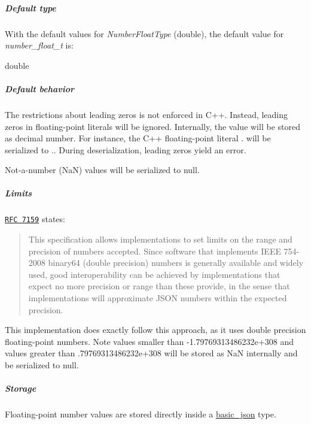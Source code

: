 \subparagraph*{Default type}

With the default values for {\itshape Number\+Float\+Type} ({\ttfamily double}), the default value for {\itshape number\+\_\+float\+\_\+t} is\+:


\begin{DoxyCode}
\textcolor{keywordtype}{double}
\end{DoxyCode}


\subparagraph*{Default behavior}


\begin{DoxyItemize}
\item The restrictions about leading zeros is not enforced in C++. Instead, leading zeros in floating-\/point literals will be ignored. Internally, the value will be stored as decimal number. For instance, the C++ floating-\/point literal {.} will be serialized to {.}. During deserialization, leading zeros yield an error.
\item Not-\/a-\/number (NaN) values will be serialized to {\ttfamily null}.
\end{DoxyItemize}

\subparagraph*{Limits}

\href{http://rfc7159.net/rfc7159}{\tt R\+FC 7159} states\+: \begin{quote}
This specification allows implementations to set limits on the range and precision of numbers accepted. Since software that implements I\+E\+EE 754-\/2008 binary64 (double precision) numbers is generally available and widely used, good interoperability can be achieved by implementations that expect no more precision or range than these provide, in the sense that implementations will approximate J\+S\+ON numbers within the expected precision. \end{quote}


This implementation does exactly follow this approach, as it uses double precision floating-\/point numbers. Note values smaller than {\ttfamily -\/1.\+79769313486232e+308} and values greater than {.\+79769313486232e+308} will be stored as NaN internally and be serialized to {\ttfamily null}.

\subparagraph*{Storage}

Floating-\/point number values are stored directly inside a \hyperlink{classnlohmann_1_1basic__json}{basic\+\_\+json} type.

